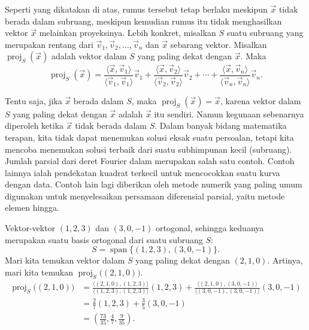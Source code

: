 Seperti yang dikatakan di atas, rumus tersebut tetap berlaku meskipun $\vec{x}$ tidak berada dalam
subruang, meskipun kemudian rumus itu tidak menghasilkan vektor $\vec{x}$
melainkan proyeksinya. Lebih konkret, misalkan $S$ suatu subruang
yang merupakan rentang dari $\vec{v}_1,\vec{v}_2,\ldots,\vec{v}_n$ dan $\vec{x}$
sebarang vektor. Misalkan $\operatorname{proj}_{S}(\vec{x})$ adalah vektor dalam $S$
yang paling dekat dengan $\vec{x}$. Maka
\begin{equation*}
\operatorname{proj}_{S}(\vec{x}) =
\frac{\langle \vec{x}, \vec{v}_1 \rangle}{
\langle \vec{v}_1, \vec{v}_1 \rangle
}
\vec{v}_1
+
\frac{\langle \vec{x}, \vec{v}_2 \rangle}{
\langle \vec{v}_2, \vec{v}_2 \rangle
}
\vec{v}_2
+
\cdots
+
\frac{\langle \vec{x}, \vec{v}_n \rangle}{
\langle \vec{v}_n, \vec{v}_n \rangle
}
\vec{v}_n .
\end{equation*}

Tentu saja, jika $\vec{x}$ berada dalam $S$, maka $\operatorname{proj}_{S}(\vec{x}) =
\vec{x}$, karena vektor dalam $S$ yang paling dekat dengan $\vec{x}$ adalah $\vec{x}$ itu sendiri.
Namun kegunaan sebenarnya diperoleh ketika $\vec{x}$ tidak berada dalam $S$.
Dalam banyak bidang matematika terapan, kita tidak dapat menemukan solusi eksak suatu persoalan,
tetapi kita mencoba
menemukan solusi terbaik dari suatu subhimpunan kecil (subruang). Jumlah parsial dari
deret Fourier dalam  merupakan salah satu contoh. Contoh lainnya
ialah pendekatan kuadrat terkecil untuk mencocokkan suatu kurva dengan data. Contoh lain lagi
diberikan oleh
metode numerik yang paling umum digunakan untuk menyelesaikan persamaan diferensial
parsial, yaitu metode elemen hingga.

\begin{example}
Vektor-vektor $(1,2,3)$ dan $(3,0,-1)$ ortogonal, sehingga keduanya merupakan
suatu basis ortogonal dari suatu subruang $S$:
\begin{equation*}
S =
\operatorname{span} \bigl\{ (1,2,3), (3,0,-1) \bigr\} .
\end{equation*}
Mari kita temukan vektor dalam $S$ yang paling dekat dengan $(2,1,0)$. Artinya,
mari kita temukan $\operatorname{proj}_{S}\bigl((2,1,0)\bigr)$.
\begin{equation*}
\begin{split}
\operatorname{proj}_{S}\bigl((2,1,0)\bigr)
& =
\frac{\langle (2,1,0), (1,2,3) \rangle}{
\langle (1,2,3), (1,2,3) \rangle
}
(1,2,3)
+
\frac{\langle (2,1,0), (3,0,-1) \rangle}{
\langle (3,0,-1), (3,0,-1) \rangle
}
(3,0,-1)
\\
& =
\frac{2}{7}
(1,2,3)
+
\frac{3}{5}
(3,0,-1)
\\
&=
\left( \frac{73}{35} , \frac{4}{7} , \frac{9}{35} \right) .
\end{split}
\end{equation*}
\end{example}

